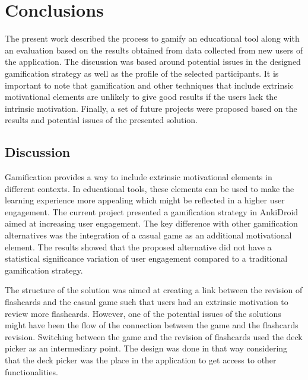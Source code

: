 
\chapter{Conclusions} %

\label{conc} %


The present work described the process to gamify an educational tool along with an evaluation based on the results obtained from data collected from new users of the application. The discussion was based around potential issues in the designed gamification strategy as well as the profile of the selected participants. It is important to note that gamification and other techniques that include extrinsic motivational elements are unlikely to give good results if the users lack the intrinsic motivation. Finally, a set of future projects were proposed based on the results and potential issues of the presented solution.

\section{Discussion}
Gamification provides a way to include extrinsic motivational elements in different contexts. In educational tools, these elements can be used to make the learning experience more appealing which might be reflected in a higher user engagement. The current project presented a gamification strategy in AnkiDroid aimed at increasing user engagement. The key difference with other gamification alternatives was the integration of a casual game as an additional motivational element. The results showed that the proposed alternative did not have a statistical significance variation of user engagement compared to a traditional gamification strategy.

The structure of the solution was aimed at creating a link between the revision of flashcards and the casual game such that users had an extrinsic motivation to review more flashcards. However, one of the potential issues of the solutions might have been the flow of the connection between the game and the flashcards revision. Switching between the game and the revision of flashcards used the deck picker as an intermediary point. The design was done in that way considering that the deck picker was the place in the application to get access to other functionalities.

